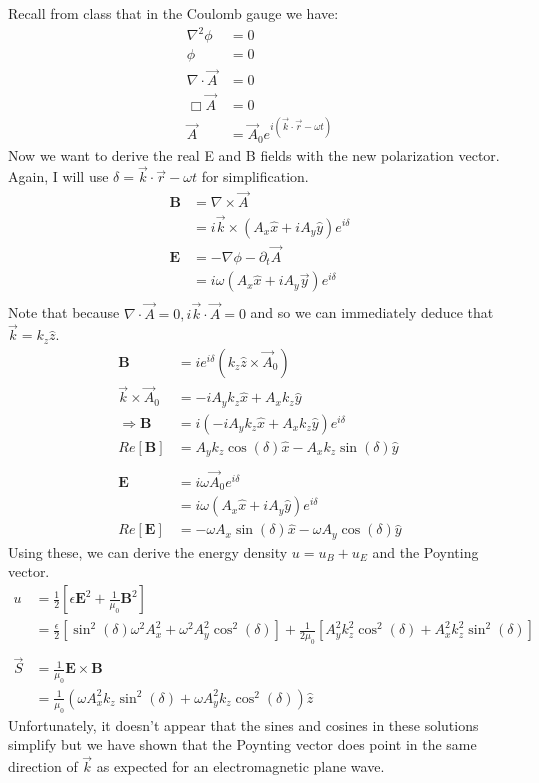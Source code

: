 \documentclass[a4paper, 11pt]{article}
\begin{document}
Recall from class that in the Coulomb gauge we have: 
	\begin{align*}
		\nabla^2\phi &= 0 \\
		\phi &= 0 \\ 
		\nabla \cdot \vec{A} &= 0 \\ 
		\Box \vec{A} &= 0 \\ 
		\vec{A} &= \vec{A}_0e^{i(\vec{k}\cdot\vec{r}-\omega t)}
	\end{align*}
Now we want to derive the real E and B fields with the new polarization vector. Again, I will use $\delta = \vec{k}\cdot\vec{r}-\omega t$ for simplification.  
	\begin{align*}
		\mathbf{B} 	&= \nabla \times \vec{A} \\ 
					&= i\vec{k}\times(A_x\hat{x}+iA_y\hat{y})e^{i\delta} \\ 
		\mathbf{E} 	&= -\nabla \phi - \partial_t \vec{A} \\ 
					&= i\omega(A_x\hat{x}+iA_y\vec{y})e^{i\delta} \\ 
	\end{align*}	
Note that because $\nabla \cdot \vec{A}=0, i\vec{k}\cdot\vec{A} =0$ and so we can immediately deduce that $\vec{k} = k_z\hat{z}$.
	\begin{align*}
		\mathbf{B} &= ie^{i\delta}(k_z\hat{z}\times\vec{A}_0) \\ 
		\vec{k}\times\vec{A}_0 &= -iA_yk_z\hat{x} + A_xk_z\hat{y} \\ 
		\Rightarrow\mathbf{B} &= i(-iA_yk_z\hat{x} + A_xk_z\hat{y})e^{i\delta} \\ 
		Re[\mathbf{B}] &= A_yk_z\cos(\delta)\hat{x}-A_xk_z\sin(\delta)\hat{y} \\ 
		\\
		\mathbf{E} 	&= i\omega \vec{A}_0e^{i\delta} \\ 
					&= i\omega (A_x\hat{x} + iA_y\hat{y})e^{i\delta} \\ 
		Re[\mathbf{E}] &= -\omega A_x\sin(\delta)\hat{x} - \omega A_y \cos(\delta)\hat{y} 
	\end{align*}
Using these, we can derive the energy density $u = u_B + u_E$ and the Poynting vector. 
	\begin{align*}
		u 	&= \frac{1}{2}[\epsilon\mathbf{E}^2+\frac{1}{\mu_0}\mathbf{B}^2] \\ 
			&= \frac{\epsilon}{2}[\sin^2(\delta)\omega^2A_x^2+\omega^2 A_y^2\cos^2(\delta)] + \frac{1}{2\mu_0}[A_y^2k_z^2\cos^2(\delta)+A_x^2k_z^2\sin^2(\delta)]	\\ 
			\\
		\vec{S} &= \frac{1}{\mu_0}\mathbf{E}\times\mathbf{B} \\ 
				&= \frac{1}{\mu_0}(\omega A_x^2k_z\sin^2(\delta)+\omega A_y^2k_z\cos^2(\delta))\hat{z} 
	\end{align*}
Unfortunately, it doesn't appear that the sines and cosines in these solutions simplify but we have shown that the Poynting vector does point in the same direction of $\vec{k}$ as expected for an electromagnetic plane wave. 
	
	
	
	
	
	
	
	
	
	
	
	
	
\end{document}
